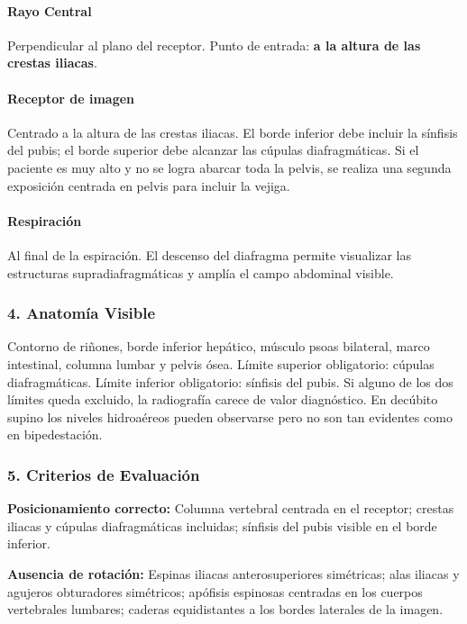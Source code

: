 	\paragraph{Rayo Central}
	Perpendicular al plano del receptor. Punto de entrada: \textbf{a la altura de las crestas iliacas}.
	
	\paragraph{Receptor de imagen}
	Centrado a la altura de las crestas iliacas. El borde inferior debe incluir la sínfisis del pubis; el borde superior debe alcanzar las cúpulas diafragmáticas. Si el paciente es muy alto y no se logra abarcar toda la pelvis, se realiza una segunda exposición centrada en pelvis para incluir la vejiga.
	
	\paragraph{Respiración}
	Al final de la espiración. El descenso del diafragma permite visualizar las estructuras supradiafragmáticas y amplía el campo abdominal visible.

	
	\subsubsection*{4. Anatomía Visible}
	
	Contorno de riñones, borde inferior hepático, músculo psoas bilateral, marco intestinal, columna lumbar y pelvis ósea. Límite superior obligatorio: cúpulas diafragmáticas. Límite inferior obligatorio: sínfisis del pubis. Si alguno de los dos límites queda excluido, la radiografía carece de valor diagnóstico. En decúbito supino los niveles hidroaéreos pueden observarse pero no son tan evidentes como en bipedestación.
	
	\subsubsection*{5. Criterios de Evaluación}
	
	\textbf{Posicionamiento correcto:} Columna vertebral centrada en el receptor; crestas iliacas y cúpulas diafragmáticas incluidas; sínfisis del pubis visible en el borde inferior.
	
	\textbf{Ausencia de rotación:} Espinas iliacas anterosuperiores simétricas; alas iliacas y agujeros obturadores simétricos; apófisis espinosas centradas en los cuerpos vertebrales lumbares; caderas equidistantes a los bordes laterales de la imagen.
	
